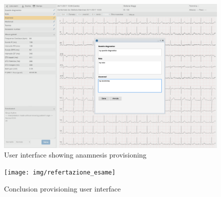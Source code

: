 \begin{figure}[h]
    \includegraphics[width=\textwidth]{img/aggiunta_anamnesi}
    \caption{User interface showing anamnesis provisioning}
    \label{fig:aggiunta_anamnesi}
\end{figure}

\begin{figure}[h]
    \texttt{[image: img/refertazione\_esame]}
    \caption{Conclusion provisioning user interface}
    \label{fig:refertazione_esame}
\end{figure}



